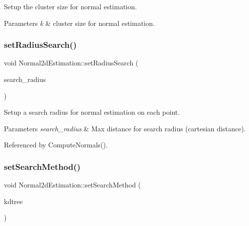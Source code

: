 Setup the cluster size for normal estimation. 


\begin{DoxyParams}{Parameters}
{\em k} & cluster size for normal estimation. \\
\hline
\end{DoxyParams}
\mbox{\label{classNormal2dEstimation_aebdbc9d5d5cabd269522f42af9d1552f}} 
\subsubsection{\texorpdfstring{set\+Radius\+Search()}{setRadiusSearch()}}
{\footnotesize\ttfamily void Normal2d\+Estimation\+::set\+Radius\+Search (\begin{DoxyParamCaption}\item[{double}]{search\+\_\+radius }\end{DoxyParamCaption})\hspace{0.3cm}{\ttfamily [inline]}}



Setup a search radius for normal estimation on each point. 


\begin{DoxyParams}{Parameters}
{\em search\+\_\+radius} & Max distance for search radius (cartesian distance). \\
\hline
\end{DoxyParams}


Referenced by Compute\+Normals().

\mbox{\label{classNormal2dEstimation_a87261649c17ea4f561da89066591a900}} 
\subsubsection{\texorpdfstring{set\+Search\+Method()}{setSearchMethod()}}
{\footnotesize\ttfamily void Normal2d\+Estimation\+::set\+Search\+Method (\begin{DoxyParamCaption}\item[{const \hyperlink{Normal2dEstimation_8h_a8b809d6f98757c822d529e8f675940cd}{Ptrkd\+Tree} \&}]{kdtree }\end{DoxyParamCaption})\hspace{0.3cm}{\ttfamily [inline]}}



